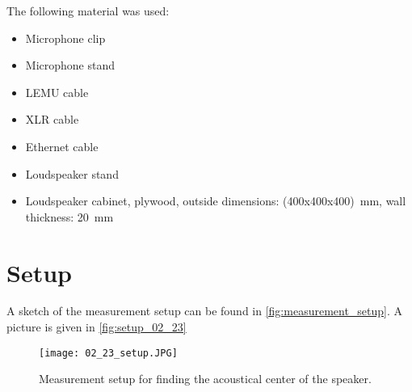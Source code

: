 The following material was used:
\begin{itemize}[noitemsep]
\item Microphone clip
\item Microphone stand
\item LEMU cable
\item XLR cable
\item Ethernet cable
\item Loudspeaker stand
\item Loudspeaker cabinet, plywood, outside dimensions: (400x400x400)\SI{}{\milli\meter}, wall thickness: \SI{20}{\milli\meter}
\end{itemize}

\section*{Setup}
A sketch of the measurement setup can be found in \autoref{fig:measurement_setup}. A picture is given in \autoref{fig:setup_02_23}


\begin{figure}[htbp]
	\centering
	\texttt{[image: 02\_23\_setup.JPG]}
	\caption{Measurement setup for finding the acoustical center of the speaker.}
		\label{fig:setup_02_23}
\end{figure}